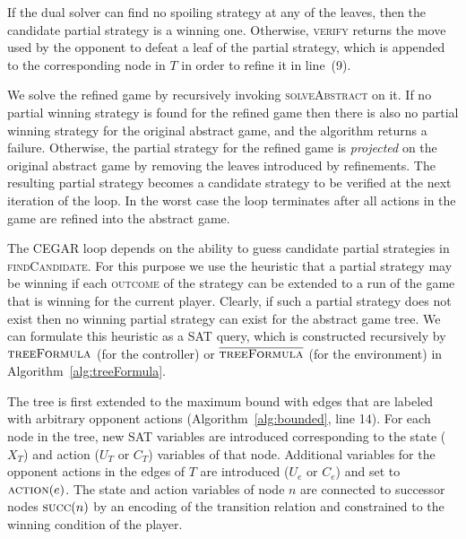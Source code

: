 If the dual solver can find no spoiling strategy at any of the leaves, then the candidate partial strategy is a winning one. Otherwise, \textsc{verify} returns the move used by the opponent to defeat a leaf of the partial strategy, which is appended to the corresponding node in $T$ in order to refine it in line~(9).  

We solve the refined game by recursively invoking \textsc{solveAbstract} on it.  If no partial winning strategy is found for the refined game then there is also no partial winning strategy for the original abstract game, and the algorithm returns a failure.  Otherwise, the partial strategy for the refined game is \emph{projected} on the original abstract game by removing the leaves introduced by refinements. The resulting partial strategy becomes a candidate strategy to be verified at the next iteration of the loop. In the worst case the loop terminates after all actions in the game are refined into the abstract game.  

The CEGAR loop depends on the ability to guess candidate partial strategies in \textsc{findCandidate}. For this purpose we use the heuristic that a partial strategy may be winning if each \textsc{outcome} of the strategy can be extended to a run of the game that is winning for the current player.  Clearly, if such a partial strategy does not exist then no winning partial strategy can exist for the abstract game tree. We can formulate this heuristic as a SAT query, which is constructed recursively by $\textsc{treeFormula}$ (for the controller) or $\textsc{$\overline{\mbox{treeFormula}}$}$ (for the environment) in Algorithm~\ref{alg:treeFormula}.  

The tree is first extended to the maximum bound with edges that are labeled with arbitrary opponent actions (Algorithm~\ref{alg:bounded}, line 14).  For each node in the tree, new SAT variables are introduced corresponding to the state ($X_T$) and action ($U_T$ or $C_T$) variables of that node. Additional variables for the opponent actions in the edges of $T$ are introduced ($U_e$ or $C_e$) and set to $\textsc{action}(e)$.  The state and action variables of node $n$ are connected to successor nodes $\textsc{succ}(n)$ by an encoding of the transition relation and constrained to the winning condition of the player.  


